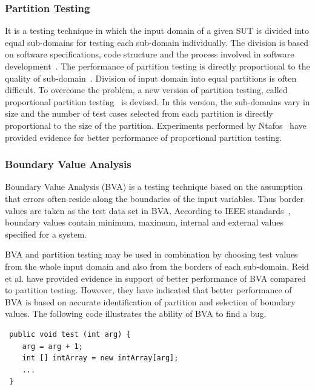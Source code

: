 \subsubsection{Partition Testing}
It is a testing technique in which the input domain of a given SUT is divided into equal sub-domains for testing each sub-domain individually. The division is based on software specifications, code structure and the process involved in software development~\cite{hamlet1990partition}. The performance of partition testing is directly proportional to the quality of sub-domain~\cite{weyuker1991analyzing}. Division of input domain into equal partitions is often difficult. To overcome the problem, a new version of partition testing, called proportional partition testing~\cite{chan1996proportional} is devised. In this version, the sub-domains vary in size and the number of test cases selected from each partition is directly proportional to the size of the partition. Experiments performed by Ntafos~\cite{ntafos1998random} have provided evidence for better performance of proportional partition testing.


\subsubsection{Boundary Value Analysis}
Boundary Value Analysis (BVA) is a testing technique based on the assumption that errors often reside along the boundaries of the input variables. Thus border values are taken as the test data set in BVA. According to IEEE standards~\cite{radatz1990ieee}, boundary values contain minimum, maximum, internal and external values specified for a system. 

BVA and partition testing may be used in combination by choosing test values from the whole input domain and also from the borders of each sub-domain. Reid et al. \cite{reid1997empirical} have provided evidence in support of better performance of BVA compared to partition testing. However, they have indicated that better performance of BVA is based on accurate identification of partition and selection of boundary values. The following code illustrates the ability of BVA to find a bug. 

\begin{lstlisting}
 public void test (int arg) {
	arg = arg + 1;
	int [] intArray = new intArray[arg];
	...
 }
\end{lstlisting}

